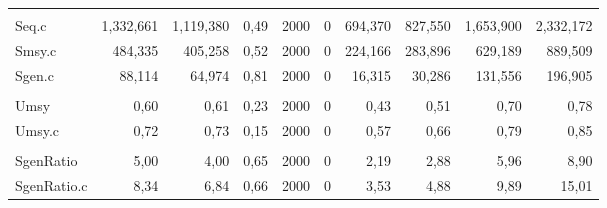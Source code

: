 \documentclass[french,11pt]{book}
\begin{document}
\begin{longtable}[t]{lrrrrrrrrr}
\midrule\\ Seq.c & 1,332,661 & 1,119,380 & 0,49 & 2000 & 0 & 694,370 & 827,550 & 1,653,900 & 2,332,172\\ Smsy.c & 484,335 & 405,258 & 0,52 & 2000 & 0 & 224,166 & 283,896 & 629,189 & 889,509\\ Sgen.c & 88,114 & 64,974 & 0,81 & 2000 & 0 & 16,315 & 30,286 & 131,556 & 196,905\\
\midrule\\ Umsy & 0,60 & 0,61 & 0,23 & 2000 & 0 & 0,43 & 0,51 & 0,70 & 0,78\\ Umsy.c & 0,72 & 0,73 & 0,15 & 2000 & 0 & 0,57 & 0,66 & 0,79 & 0,85\\
\midrule\\ SgenRatio & 5,00 & 4,00 & 0,65 & 2000 & 0 & 2,19 & 2,88 & 5,96 & 8,90\\ SgenRatio.c & 8,34 & 6,84 & 0,66 & 2000 & 0 & 3,53 & 4,88 & 9,89 & 15,01\\* \end{longtable}

\endgroup{} \endgroup{}
\end{document}
